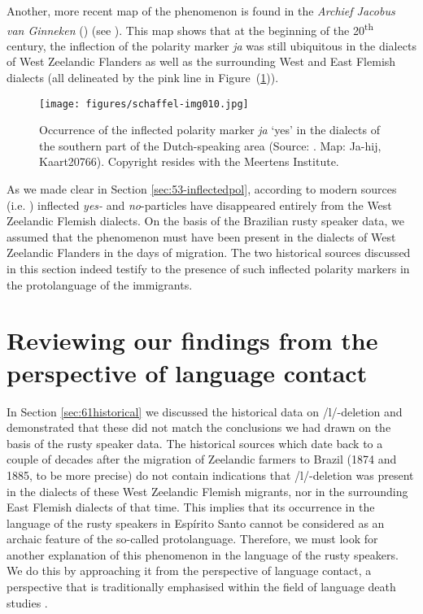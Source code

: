 \documentclass[output=paper,hidelinks,draftmode]{langscibook}
\begin{document}
Another, more recent map of the phenomenon is found in the \textit{Archief Jacobus van Ginneken} (\citeyear{Ginneken01}) (see ). This map shows that at the beginning of the 20\textsuperscript{th} century, the inflection of the polarity marker \textit{ja} was still ubiquitous in the dialects of West Zeelandic Flanders as well as the surrounding West and East Flemish dialects (all delineated by the pink line in Figure~(\ref{fig:schaffel:9})).



\begin{figure}[t]
\caption{Occurrence of the inflected polarity marker \textit{ja} ‘yes’ in the dialects of the southern part of the Dutch-speaking area (Source: \citeauthor{Ginneken01}. Map: Ja-hij, Kaart20766). Copyright resides with the Meertens Institute.}
\label{fig:schaffel:9}
\texttt{[image: figures/schaffel-img010.jpg]}
\end{figure}



As we made clear in Section \ref{sec:53-inflectedpol}, according to modern sources (i.e. \citealt{Barbiers2006, DeVogelaerDevos2008}) inflected \textit{yes-} and \textit{no}{}-particles have disappeared entirely from the West Zeelandic Flemish dialects. On the basis of the Brazilian rusty speaker data, we assumed that the phenomenon must have been present in the dialects of West Zeelandic Flanders in the days of migration. The two historical sources discussed in this section indeed testify to the presence of such inflected polarity markers in the protolanguage of the immigrants.

\section{Reviewing our findings from the perspective of language contact}
\label{reviewingourfindings}


In Section \ref{sec:61historical} we discussed the historical data on /l/-deletion and demonstrated that these did not match the conclusions we had drawn on the basis of the rusty speaker data. The historical sources which date back to a couple of decades after the migration of Zeelandic farmers to Brazil (1874 and 1885, to be more precise) do not contain indications that /l/-deletion was present in the dialects of these West Zeelandic Flemish migrants, nor in the surrounding East Flemish dialects of that time. This implies that its occurrence in the language of the rusty speakers in Espírito Santo cannot be considered as an archaic feature of the so-called protolanguage. Therefore, we must look for another explanation of this phenomenon in the language of the rusty speakers. We do this by approaching it from the perspective of language contact, a perspective that is traditionally emphasised within the field of language death studies \citep{Dressler1996, Dressler1972, Dressler1996, Dorian1977, Dorian1981}.
\end{document}
